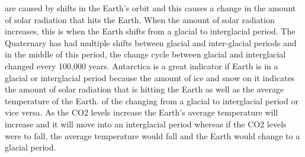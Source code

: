         \ddd {} are caused by shifts in the Earth's orbit and this causes a change in the amount of solar radiation that hits the Earth. When the amount of solar radiation increases, this is when the Earth shifts from a glacial to interglacial period. The Quaternary has had multiple shifts between glacial and inter-glacial periods and in the middle of this period, the change cycle between glacial and interglacial changed every 100,000 years. 
        \ddd Antarctica is a great indicator if Earth is in a glacial or interglacial period because the amount of ice and snow on it indicates the amount of solar radiation that is hitting the Earth as well as the average temperature of the Earth.
        \ddd {} of the changing from a glacial to interglacial period or vice versa. As the CO2 levels increase the Earth's average temperature will increase and it will move into an interglacial period whereas if the CO2 levels were to fall, the average temperature would fall and the Earth would change to a glacial period.
	